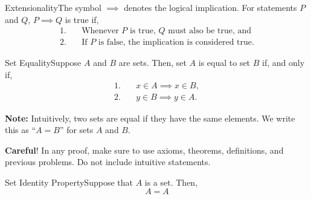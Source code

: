 \vspace*{\fill}

\begin{definition}
    {Extensionality}The symbol $\implies$ denotes the logical implication. For statements $P$ and $Q$, $P \implies Q$ is true if,
    \begin{align*}
        1. & \quad \text{Whenever } P \text{ is true, } Q \text{ must also be true, and} \\
        2. & \quad \text{If } P \text{ is false, the implication is considered true.}
    \end{align*}
\end{definition}

\begin{axiom}
    {Set Equality}Suppose $A$ and $B$ are sets. Then, set $A$ is equal to set $B$ if, and only if,
    \begin{align*}
        1. & \quad x \in A \implies x \in B, \\
        2. & \quad y \in B \implies y \in A.
    \end{align*}
\end{axiom}

\begin{note}
    \textbf{Note:} Intuitively, two sets are equal if they have the same elements. We write this as ``$A = B$'' for sets $A$ and $B$. 

    \hspace{0.5em}\textbf{Careful}! In any proof, make sure to use axioms, theorems, definitions, and previous problems. Do not include intuitive statements.
\end{note}



\begin{exercise}
    {Set Identity Property}Suppose that $A$ is a set. Then, $$A = A$$
\end{exercise}


\pfs

